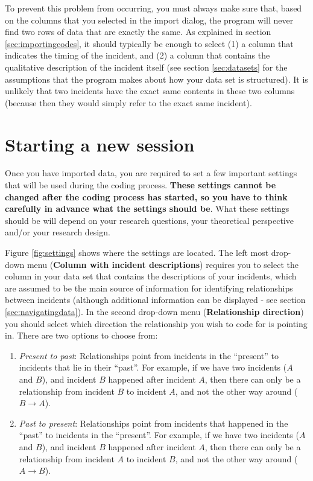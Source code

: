 \documentclass{memoir}
\begin{document}
To prevent this problem from occurring, you must always make sure that, based on the columns that you selected in the import dialog, the program will never find two rows of data that are exactly the same. As explained in section \ref{sec:importingcodes}, it should typically be enough to select (1) a column that indicates the timing of the incident, and (2) a column that contains the qualitative description of the incident itself (see section \ref{sec:datasets} for the assumptions that the program makes about how your data set is structured). It is unlikely that two incidents have the exact same contents in these two columns (because then they would simply refer to the exact same incident).

\section{Starting a new session}
\label{sec:startinganewsession}

Once you have imported data, you are required to set a few important settings that will be used during the coding process. \textbf{These settings cannot be changed after the coding process has started, so you have to think carefully in advance what the settings should be}. What these settings should be will depend on your research questions, your theoretical perspective and/or your research design.

Figure \ref{fig:settings} shows where the settings are located. The left most drop-down menu (\textbf{Column with incident descriptions}) requires you to select the column in your data set that contains the descriptions of your incidents, which are assumed to be the main source of information for identifying relationships between incidents (although additional information can be displayed - see section \ref{sec:navigatingdata}). In the second drop-down menu (\textbf{Relationship direction}) you should select which direction the relationship you wish to code for is pointing in. There are two options to choose from:
\begin{enumerate}
\item{\emph{Present to past}: Relationships point from incidents in the ``present'' to incidents that lie in their ``past''. For example, if we have two incidents (\(A\) and \(B\)), and incident \(B\) happened after incident \(A\), then there can only be a relationship from incident \(B\) to incident \(A\), and not the other way around (\(B\rightarrow A\)).}
\item{\emph{Past to present}: Relationships point from incidents that happened in the ``past'' to incidents in the ``present''}. For example, if we have two incidents (\(A\) and \(B\)), and incident \(B\) happened after incident \(A\), then there can only be a relationship from incident \(A\) to incident \(B\), and not the other way around (\(A\rightarrow B\)).
\end{enumerate}
\end{document}
